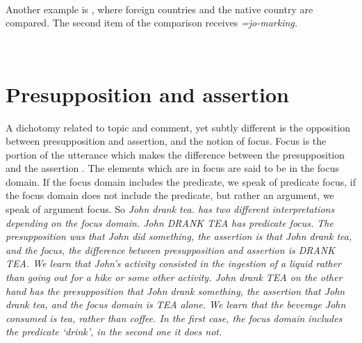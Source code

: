  \\

Another example is , where foreign countries and the native country are compared. The second item of the comparison   receives \em=jo\em-marking.

 \\
\section{Presupposition and assertion}\label{sec:disc:Presuppositionandassertion}
A dichotomy related to topic and comment, yet subtly different is the opposition between presupposition and assertion, and the notion of focus.
Focus is the portion of the utterance which makes the difference between the presupposition and the assertion \citep{Lambrecht1994}. The elements which are in focus are said to be in the focus domain. If the focus domain includes the predicate, we speak of predicate focus, if the focus domain does not include the predicate, but rather an argument, we speak of argument focus. So \em John drank tea. \em has two different interpretations depending on the focus domain. \em John DRANK TEA \em has predicate focus. The presupposition was that John did something, the assertion is that John drank tea, and the focus, the difference between presupposition and assertion is DRANK TEA. We learn that John's activity consisted in the ingestion of a liquid rather than going out for a hike or some other activity.
\em John drank TEA \em on the other hand has the presupposition that John drank something, the assertion that John drank tea, and the focus domain is TEA alone. We learn that the beverage John consumed is tea, rather than coffee. In the first case, the focus domain includes the predicate `drink', in the second one it does not.

